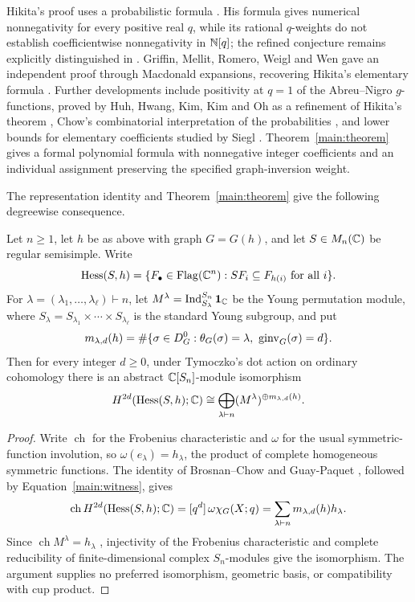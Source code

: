 Hikita's proof uses a probabilistic formula \cite{Hik24}. His formula gives numerical
nonnegativity for every positive real $q$, while its rational
$q$-weights do not establish coefficientwise nonnegativity in $\mathbb N[q]$;
the refined conjecture remains explicitly distinguished in
\cite[Section~1.3]{Hik24}.  Griffin, Mellit, Romero, Weigl and Wen gave
an independent proof through Macdonald expansions, recovering Hikita's
elementary formula \cite{GMRWW25}. Further developments include
positivity at $q=1$ of the Abreu--Nigro $g$-functions, proved by
Huh, Hwang, Kim, Kim and Oh as a refinement of Hikita's theorem
\cite{HHKKO25},
Chow's combinatorial interpretation of the probabilities \cite{Chow26},
and lower bounds for elementary coefficients studied by Siegl
\cite{Siegl26}.  Theorem~\ref{main:theorem} gives a formal polynomial
formula with nonnegative integer coefficients and an individual
assignment preserving the specified graph-inversion weight.

The representation identity and Theorem~\ref{main:theorem} give the
following degreewise consequence.

\begin{corollary}
\label{main:hessenberg}
Let $n\ge1$, let $h$ be as above with graph $G=G(h)$, and let
$S\in M_n(\mathbb C)$ be regular semisimple. Write
\[
 \operatorname{Hess}(S,h)=
 \{F_\bullet\in\operatorname{Flag}(\mathbb C^n):
     SF_i\subseteq F_{h(i)}\text{ for all }i\}.
\]
For $\lambda=(\lambda_1,\ldots,\lambda_\ell)\vdash n$, let
$M^\lambda=\operatorname{Ind}_{S_\lambda}^{S_n}\mathbf{1}_{\mathbb C}$ be the
Young permutation module, where
$S_\lambda=S_{\lambda_1}\times\cdots\times S_{\lambda_\ell}$ is the
standard Young subgroup, and put
\[
 m_{\lambda,d}(h)=
 \#\{\sigma\in D_G^0:\theta_G(\sigma)=\lambda,\ \ginv_G(\sigma)=d\}.
\]
Then for every integer $d\ge0$, under Tymoczko's dot action on ordinary
cohomology there is an abstract $\mathbb C[S_n]$-module isomorphism
\[
 H^{2d}(\operatorname{Hess}(S,h);\mathbb C)
 \cong\bigoplus_{\lambda\vdash n}(M^\lambda)^{\oplus m_{\lambda,d}(h)}.
\]
\end{corollary}

\begin{proof}
Write $\operatorname{ch}$ for the Frobenius characteristic and $\omega$
for the usual symmetric-function involution, so
$\omega(e_\lambda)=h_\lambda$, the product of complete homogeneous
symmetric functions. The identity of Brosnan--Chow
\cite[Theorem~129]{BC18} and Guay-Paquet \cite{GP16}, followed by
Equation~\eqref{main:witness}, gives
\[
 \operatorname{ch}H^{2d}(\operatorname{Hess}(S,h);\mathbb C)
 =[q^d]\,\omega\chi_G(X;q)
 =\sum_{\lambda\vdash n}m_{\lambda,d}(h)h_\lambda.
\]
Since $\operatorname{ch}M^\lambda=h_\lambda$
\cite[proof of Proposition~10]{BC18}, injectivity of the Frobenius
characteristic and complete reducibility of finite-dimensional complex
$S_n$-modules give the isomorphism.
The argument supplies no preferred isomorphism, geometric basis, or
compatibility with cup product.
\end{proof}

